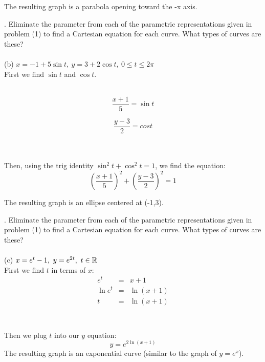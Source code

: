 \documentclass[11pt]{exam}
\begin{document}
The resulting graph is a parabola opening toward the -x axis.




. Eliminate the parameter from each of the parametric representations given in problem (1) to find a Cartesian equation for each curve. What types of curves are these? \\
\\
\indent (b) $x = -1 + 5\sin t,\ y = 3 + 2 \cos t,\ 0 \leq t \leq 2\pi$\\
\newline
\newline
First we find $\sin t$ and $\cos t$.\\
\\
\noindent\begin{minipage}{.5\linewidth}
\begin{equation*}
  \frac{x+1}{5}=\sin t
\end{equation*}
\end{minipage}%
\begin{minipage}{.5\linewidth}
\begin{equation*}
  \frac{y-3}{2}=cos t
\end{equation*}
\end{minipage}
\\
\\
Then, using the trig identity $\sin^2 t + \cos^2 t = 1$, we find the equation:
$$\left(\frac{x+1}{5}\right)^2 + \left(\frac{y-3}{2}\right)^2 = 1$$

The resulting graph is an ellipse centered at (-1,3).




. Eliminate the parameter from each of the parametric representations given in problem (1) to find a Cartesian equation for each curve. What types of curves are these? \\
\\
\indent (c) $x = e^t - 1,\ y = e^{2t},\ t \in \Bbb{R} $\\
\newline
\newline
First we find $t$ in terms of $x$:\\
\begin{eqnarray*}
e^t &=& x + 1\\
\ln e^t &=& \ln (x+1)\\
t &=& \ln (x+1)\\
\end{eqnarray*}
\\
\\
Then we plug $t$ into our $y$ equation:
$$y = e^{2\ln (x+1)}$$
The resulting graph is an exponential curve (similar to the graph of $y=e^x$).
\end{document}
